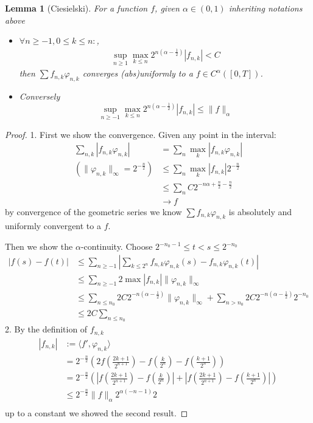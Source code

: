 \documentclass[a4paper,11pt]{book}
\newtheorem{lemma}[theorem]{Lemma}
\theoremstyle{definition}
\theoremstyle{remark}
\begin{document}
\begin{lemma}[Ciesielski]
For a function $f$, given $\alpha \in (0, 1)$ inheriting notations above
\begin{itemize}
	\item $\forall n \geq -1, 0 \leq k \leq n:$,
	\begin{align*}
		\sup_{n \geq 1} \max_{ k \leq n}  2^{n(\alpha - \frac{1}{2})} |f_{n, k}| < C
	\end{align*} then $\sum f_{n, k} \varphi_{n, k}$ converges (abs)uniformly to a $f \in C^\alpha([0, T])$. 
	\item  Conversely
	\begin{equation*}
		\sup_{n \geq -1} \max_{k \leq n} 2^{n(\alpha - \frac{1}{2})}|f_{n, k}| \leq \|f\|_\alpha
	\end{equation*}
\end{itemize}
\end{lemma}
\begin{proof}
	1. First we show the convergence. Given any point in the interval:
	\begin{align*}
		\sum_{n, k} |f_{n, k} \varphi_{n, k}| &= \sum_{n} \max_k |f_{n, k}\varphi_{n, k}|\\
		(\|\varphi_{n, k}\|_\infty = 2^{-\frac{n}{2}})
  		&\leq \sum_{n} \max_k |f_{n, k}| 2^{-\frac{n}{2}}\\
  		&\leq \sum_n C 2^{-n \alpha + \frac{n}{2} - \frac{n}{2}}\\
  		&\rightarrow f
	\end{align*}
	by convergence of the geometric series we know $\sum f_{n, k} \varphi_{n, k}$ is absolutely and uniformly convergent to a $f$.\par 
	Then we show the $\alpha$-continuity. Choose $2^{-n_0 -1} \leq t < s \leq 2^{-n_0}$
	\begin{align*}
		|f(s) - f(t)| &\leq \sum_{n \geq -1} |\sum_{ k \leq 2^n} f_{n, k} \varphi_{n, k}(s) - f_{n, k} \varphi_{n, k}(t)|\\
		&\leq \sum_{n \geq -1} 2 \max |f_{n, k}| \|\varphi_{n, k}\|_\infty\\
		&\leq \sum_{n \leq n_0}2C2^{-n(\alpha - \frac{1}{2})}\|\varphi_{n, k}\|_\infty + \sum_{n > n_0}2C 2^{-n(\alpha - \frac{1}{2})}2^{-n_0}\\
		&\leq 2C\sum_{n \leq n_0} 
	\end{align*}
	2. By the definition of $f_{n, k}$
	\begin{align*}
		|f_{n, k}|&:= \langle f', \varphi_{n, k} \rangle \\
		&= 2^{-\frac{n}{2}}(2f(\frac{2k+1}{2^{n+1}}) - f(\frac{k}{2^n}) - f(\frac{k+1}{2^n}))\\
		&= 2^{-\frac{n}{2}}(|f(\frac{2k+1}{2^{n+1}}) - f(\frac{k}{2^n})| + 
		|f(\frac{2k+1}{2^{n+1}}) - f(\frac{k+1}{2^n})|)\\
		&\leq 2^{-\frac{n}{2}}\|f\|_\alpha 2^{\alpha(-n-1)}2\\
	\end{align*}
	up to a constant we showed the second result.
\end{proof}
\end{document}

